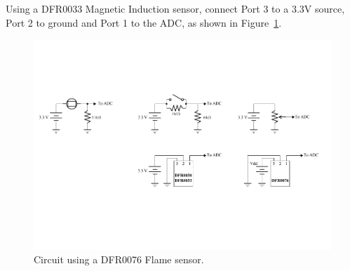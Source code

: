 \documentclass[11pt, twoside, pdftex]{article}
\newcommand{\commonPath}{../../Common}
\begin{document}
Using a {\sf DFR0033} Magnetic Induction sensor, connect Port 3 to a 3.3V source, Port 2 to ground and Port 1 to the ADC, as shown in Figure~\ref{fig:flame}.
\begin{figure} [H]
\begin{center}
\includegraphics{figures/flame_sensor.pdf}
\end{center}
\caption{Circuit using a DFR0076 Flame sensor.}
\label{fig:flame}
\end{figure}




\end{document}
